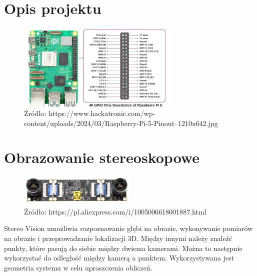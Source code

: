 \documentclass[magisterska]{pracadypl}
\begin{document}
\section{Opis projektu}

\begin{figure}[h]  %
    \centering  %
    \includegraphics[width=0.7\textwidth]{images/RPI-PIN.jpg}  %
    \captionsetup{labelformat=empty, font=footnotesize}
    \caption{Źródło: https://www.hackatronic.com/wp-content/uploads/2024/03/Raspberry-Pi-5-Pinout--1210x642.jpg}
    \label{fig:rpi-gpio}  %
\end{figure}

\section{Obrazowanie stereoskopowe}

\begin{figure}[h]  %
    \centering  %
    \includegraphics[width=0.5\textwidth]{images/MAINSTEREO.png}  %
    \captionsetup{labelformat=empty, font=footnotesize}
    \caption{Źródło: https://pl.aliexpress.com/i/1005006618001887.html}
    \label{fig:mono}  %
\end{figure}

Stereo Vision umożliwia rozpoznawanie głębi na obrazie, wykonywanie pomiarów na obrazie
i przeprowadzanie lokalizacji 3D. Między innymi należy znaleźć punkty, które pasują do siebie między dwiema kamerami. Można to następnie wykorzystać do odległość między kamerą a punktem. Wykorzystywana jest geometria systemu w celu uproszczenia obliczeń.
\end{document}
